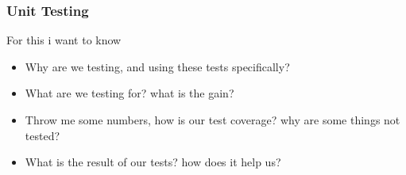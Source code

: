\subsubsection{Unit Testing}
For this i want to know
\begin{itemize}
    \item Why are we testing, and using these tests specifically?
    \item What are we testing for? what is the gain?
    \item Throw me some numbers, how is our test coverage? why are some things not tested?
    \item What is the result of our tests? how does it help us?
\end{itemize}